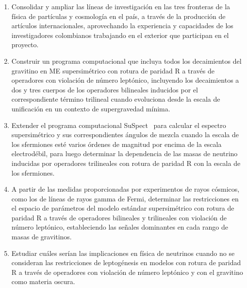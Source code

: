 \begin{enumerate}
\item Consolidar y ampliar las líneas de investigación en las tres
  fronteras de la física de partículas y cosmología en el país, a
  través de la producción de artículos internacionales, aprovechando la
  experiencia y capacidades de los investigadores colombianos
  trabajando en el exterior que participan en el proyecto.

\item \begin{gravitinodm}
  Construir un programa computacional que incluya todos los
  decaimientos del gravitino en ME supersimétrico con
  rotura de paridad R a través de operadores con violación de número
  leptónico, incluyendo los decaimientos a dos y tres cuerpos de los
  operadores bilineales inducidos por el correspondiente término
  trilineal cuando evoluciona desde la escala de unificación en un
  contexto de supergravedad mínima.
\end{gravitinodm}
\label{item:gravitinodm1}

\item 
\begin{gravitinodm}
  Extender el programa computacional
  SuSpect~\cite{Djouadi:2002ze} para calcular el espectro supersimétrico y sus
  correspondientes ángulos de mezcla cuando la escala de los
  sfermiones esté varios órdenes de magnitud por encima de la escala
  electrodébil, para luego determinar la dependencia de las masas
  de neutrino inducidas por operadores trilineales con rotura de
  paridad R con la escala de los sfermiones.
\end{gravitinodm}
\label{item:gravitinodm2}
\item 
\begin{gravitinodm}
  A partir de las medidas proporcionadas por experimentos de rayos cósmicos, como los
  de líneas de rayos gamma de Fermi, determinar las restricciones
  en el espacio de parámetros del modelo estándar supersimétrico con
  rotura de paridad R a través de operadores bilineales y trilineales
  con violación de número leptónico, estableciendo las señales
  dominantes en cada rango de masas de gravitinos.
\end{gravitinodm}

\item
\begin{gravitinodm}
  Estudiar cuáles serían las implicaciones en física de neutrinos
  cuando no se consideran las restricciones de leptogénesis en modelos
  con rotura de paridad R a través de operadores con violación de
  número leptónico y con el gravitino como materia oscura.
\end{gravitinodm}


\end{enumerate}
